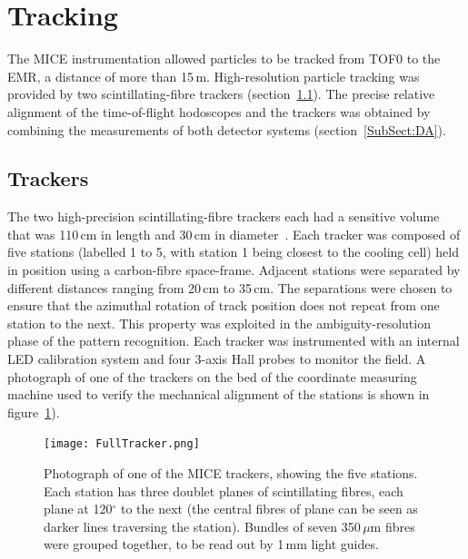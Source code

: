 \section{Tracking}
\label{Sect:Tracking}

The MICE instrumentation allowed particles to be tracked from TOF0 to
the EMR, a distance of more than 15\,m.
High-resolution particle tracking was provided by two
scintillating-fibre trackers (section~\ref{SubSect:Tracker}).
The precise relative alignment of the time-of-flight hodoscopes and
the trackers was obtained by combining the measurements of both
detector systems (section~\ref{SubSect:DA}). 

\graphicspath{{06-Tracking/Figures/}}

\subsection{Trackers}
\label{SubSect:Tracker}

The two high-precision scintillating-fibre trackers each had a
sensitive volume that was 110\,cm in length and 30\,cm in
diameter~\cite{Ellis:2010bb}.
Each tracker was composed of five stations (labelled 1 to 5, with
station 1 being closest to the cooling cell) held in position using a
carbon-fibre space-frame.  
Adjacent stations were separated by different distances ranging from
20\,cm to 35\,cm.
The separations were chosen to ensure that the azimuthal rotation of
track position does not repeat from one station to the next.
This property was exploited in the ambiguity-resolution phase of the
pattern recognition.
Each tracker was instrumented with an internal LED calibration system
and four 3-axis Hall probes to monitor the field.
A photograph of one of the trackers on the bed of the coordinate
measuring machine used to verify the mechanical alignment of the
stations is shown in figure~\ref{Figure:FullTracker}).
\begin{figure}
  \begin{center}
    \texttt{[image: FullTracker.png]}
  \end{center}
  \caption{
    Photograph of one of the MICE trackers, showing the five stations.
    Each station has three doublet planes of scintillating fibres, each plane
    at 120$^\circ$ to the next (the central fibres of plane can
    be seen as darker lines traversing the station).
    Bundles of seven 350\,$\mu$m fibres were grouped together, to be
    read out by 1\,mm light guides.
  }
  \label{Figure:FullTracker}
\end{figure}

